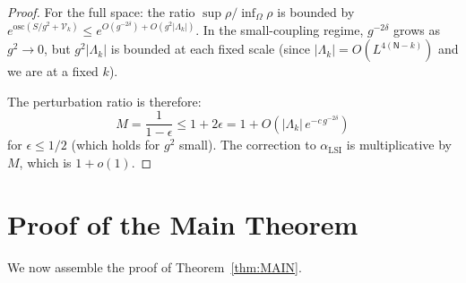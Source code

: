 \documentclass[11pt,a4paper]{article}
\theoremstyle{plain}
\theoremstyle{definition}
\theoremstyle{remark}
\newcommand{\cV}{\mathcal{V}}
\begin{document}
\begin{proof}
For the full space: the ratio $\sup \rho / \inf_\Omega \rho$
is bounded by $e^{\mathrm{osc}(S/g^2 + \cV_k)}
\le e^{O(g^{-2\delta}) + O(g^2|\Lambda_k|)}$. In the
small-coupling regime, $g^{-2\delta}$ grows as $g^2 \to 0$,
but $g^2|\Lambda_k|$ is bounded at each fixed scale
(since $|\Lambda_k| = O(L^{4(\mathsf{N}-k)})$ and we are at
a fixed $k$).

The perturbation ratio is therefore:
\begin{equation}
  M = \frac{1}{1 - \epsilon}
  \le 1 + 2\epsilon
  = 1 + O(|\Lambda_k|\,e^{-c\,g^{-2\delta}})
\end{equation}
for $\epsilon \le 1/2$ (which holds for $g^2$ small).
The correction to $\alpha_{\mathrm{LSI}}$ is
multiplicative by $M$, which is $1 + o(1)$.
\end{proof}

\section{Proof of the Main Theorem}\label{sec:continuum}

We now assemble the proof of Theorem~\ref{thm:MAIN}.
\end{document}
